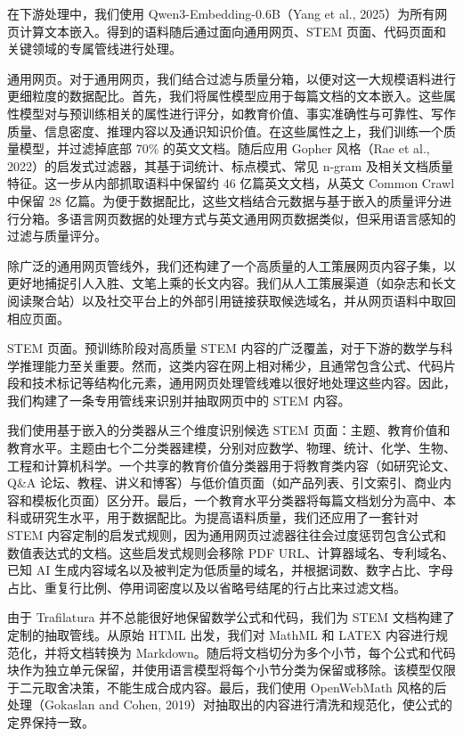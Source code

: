 \documentclass[
  10
]{article}
\begin{document}
在下游处理中，我们使用 Qwen3-Embedding-0.6B（Yang et al., 2025）为所有网页计算文本嵌入。得到的语料随后通过面向通用网页、STEM 页面、代码页面和关键领域的专属管线进行处理。

通用网页。对于通用网页，我们结合过滤与质量分箱，以便对这一大规模语料进行更细粒度的数据配比。首先，我们将属性模型应用于每篇文档的文本嵌入。这些属性模型对与预训练相关的属性进行评分，如教育价值、事实准确性与可靠性、写作质量、信息密度、推理内容以及通识知识价值。在这些属性之上，我们训练一个质量模型，并过滤掉底部 70\% 的英文文档。随后应用 Gopher 风格（Rae et al., 2022）的启发式过滤器，其基于词统计、标点模式、常见 n-gram 及相关文档质量特征。这一步从内部抓取语料中保留约 46 亿篇英文文档，从英文 Common Crawl 中保留 28 亿篇。为便于数据配比，这些文档结合元数据与基于嵌入的质量评分进行分箱。多语言网页数据的处理方式与英文通用网页数据类似，但采用语言感知的过滤与质量评分。

除广泛的通用网页管线外，我们还构建了一个高质量的人工策展网页内容子集，以更好地捕捉引人入胜、文笔上乘的长文内容。我们从人工策展渠道（如杂志和长文阅读聚合站）以及社交平台上的外部引用链接获取候选域名，并从网页语料中取回相应页面。

STEM 页面。预训练阶段对高质量 STEM 内容的广泛覆盖，对于下游的数学与科学推理能力至关重要。然而，这类内容在网上相对稀少，且通常包含公式、代码片段和技术标记等结构化元素，通用网页处理管线难以很好地处理这些内容。因此，我们构建了一条专用管线来识别并抽取网页中的 STEM 内容。

我们使用基于嵌入的分类器从三个维度识别候选 STEM 页面：主题、教育价值和教育水平。主题由七个二分类器建模，分别对应数学、物理、统计、化学、生物、工程和计算机科学。一个共享的教育价值分类器用于将教育类内容（如研究论文、Q\&A 论坛、教程、讲义和博客）与低价值页面（如产品列表、引文索引、商业内容和模板化页面）区分开。最后，一个教育水平分类器将每篇文档划分为高中、本科或研究生水平，用于数据配比。为提高语料质量，我们还应用了一套针对 STEM 内容定制的启发式规则，因为通用网页过滤器往往会过度惩罚包含公式和数值表达式的文档。这些启发式规则会移除 PDF URL、计算器域名、专利域名、已知 AI 生成内容域名以及被判定为低质量的域名，并根据词数、数字占比、字母占比、重复行比例、停用词密度以及以省略号结尾的行占比来过滤文档。

由于 Trafilatura 并不总能很好地保留数学公式和代码，我们为 STEM 文档构建了定制的抽取管线。从原始 HTML 出发，我们对 MathML 和 LATEX 内容进行规范化，并将文档转换为 Markdown。随后将文档切分为多个小节，每个公式和代码块作为独立单元保留，并使用语言模型将每个小节分类为保留或移除。该模型仅限于二元取舍决策，不能生成合成内容。最后，我们使用 OpenWebMath 风格的后处理（Gokaslan and Cohen, 2019）对抽取出的内容进行清洗和规范化，使公式的定界保持一致。
\end{document}
